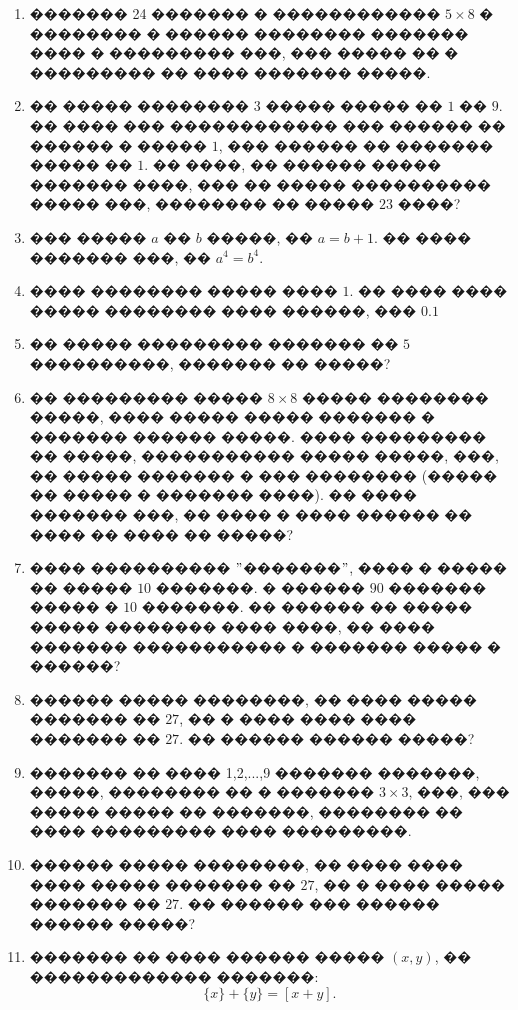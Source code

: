 \documentclass[a4paper,12pt]{article}
\begin{document}
\begin{enumerate}
    �) ��� ���������� ���� ����� ������ $88$ �� ������������� ���������� ���������������


\item ������� 24 ������� � ������������ $5\times 8$ � �������� � ������ �������� ������� ���� � ��������� ���, ��� ����� �� � ��������� �� ���� ������� �����.

\item �� ����� �������� $3$ ����� ����� �� $1$ �� $9$. �� ���� ��� ������������ ��� ������ �� ������ � ����� $1$, ��� ������ �� ������� ����� �� $1$. �� ����, �� ������ ����� ������� ����, ��� �� ����� ���������� ����� ���, �������� �� ����� $23$ ����?

\item ��� ����� $a$ �� $b$ �����, �� $a=b+1$. �� ���� ������� ���, �� $a^{4}=b^{4}$.

\item ���� �������� ����� ���� $1$. �� ���� ���� ����� �������� ���� ������, ��� $0.1$

\item �� ����� ��������� ������� �� $5$ ����������, ������� �� �����?

\item �� ��������� ����� $8\times 8$ ����� �������� �����, ���� ����� ����� ������� � ������� ������ �����. ���� ��������� �� �����, ����������� ����� �����, ���, �� ����� ������� � ��� �������� (����� �� ����� � ������� ����). �� ���� ������� ���, �� ���� � ���� ������ �� ���� �� ���� �� �����?


\item ���� ���������� $"$�������$"$, ���� � ����� �� ����� $10$ �������. � ������ $90$ ������� ����� � $10$ �������. �� ������ �� ����� ����� �������� ���� ����, �� ���� ������� ����������� � ������� ����� � ������?


\item ������ ����� ��������, �� ���� ����� ������� �� $27$, �� � ���� ���� ���� ������� �� $27$. �� ������ ������ �����?

\item ������� �� ���� 1,2,...,9 ������� �������, �����, �������� �� � ������� $3\times 3$, ���, ��� ����� ����� �� �������, �������� �� ���� ��������� ���� ���������.

\item ������ ����� ��������, �� ���� ���� ���� ����� ������� �� $27$, �� � ���� ����� ������� �� $27$. �� ������ ��� ������ ������ �����?

\item ������� �� ���� ������ ����� $(x, y)$, �� ������������� �������: $$\{x\}+\{y\}=[x+y].$$
\end{enumerate}
\end{document}
